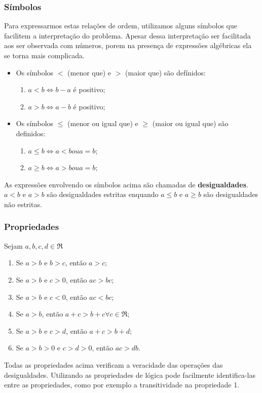 \documentclass[a4paper,12pt,twoside,BCOR=10mm]{scrbook}
\begin{document}
\begin{titlepage}
\subsubsection{Símbolos}
Para expressarmos estas relações de ordem, utilizamos alguns símbolos que facilitem a interpretação do problema. Apesar dessa interpretação ser facilitada aos ser observada com números, porem na presença de expressões algébricas ela se torna mais complicada.
\\
\begin{itemize}
\item Os símbolos $<$ (menor que) e $>$ (maior que) são defínidos:
	\begin{enumerate}
	\item $a < b \Leftrightarrow b - a$ é positivo;
	\item $a > b \Leftrightarrow a - b$ é positivo; 
	\end{enumerate}
\item Os símbolos $\leq$ (menor ou igual que) e $\geq$ (maior ou igual que) são definidos:
	\begin{enumerate}
	\item $a \leq b \Leftrightarrow a < b ou a = b$;
	\item $a \geq b \Leftrightarrow a > b ou a = b$;
	\end{enumerate}
\end{itemize}
As expressões envolvendo os símbolos acima são chamadas de \textbf{desigualdades}. $a < b$ e $a > b$ são desigualdades estritas enquando $a \leq b$ e $a \geq b$ são desigualdades não estritas.

\subsubsection{Propriedades}
Sejam $a,b,c,d \in \Re$ 
\begin{enumerate}
\item Se $a > b$ e $b > c$, então $a > c$;
\item Se $a > b$ e $c > 0$, então $ac > bc$;
\item Se $a > b$ e $c < 0$, então $ac < bc$;
\item Se $a > b$, então $a + c > b + c \forall c \in \Re$;
\item Se $a > b$ e $c > d$, então $a + c > b + d$;
\item Se $a > b > 0$ e $c > d > 0$, então $ac > db$.
\end{enumerate}
Todas as propriedades acima verificam a veracidade das operações das desigualdades. Utilizando as propriedades de lógica pode facilmente identifica-las entre as propriedades, como por exemplo a transitividade na propriedade 1.


\end{titlepage}
\end{document}
